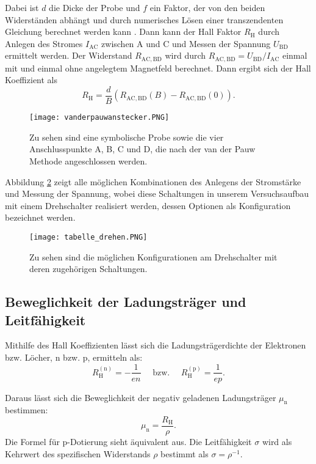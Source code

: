Dabei ist $d$ die Dicke der Probe und $f$ ein Faktor, der  von den beiden Widerständen abhängt und durch numerisches Lösen einer transzendenten Gleichung berechnet werden kann \autocite{hall}.
\newline Dann kann der Hall Faktor $R_\mathrm{H}$ durch Anlegen des Stromes $I_\mathrm{AC}$ zwischen A und C und Messen der Spannung $U_{\mathrm{BD}}$ ermittelt werden. Der Widerstand $R_{\mathrm{AC,BD}}$ wird durch $R_{\mathrm{AC,BD}}=U_{\mathrm{BD}}/I_\mathrm{AC}$ einmal mit und einmal ohne angelegtem Magnetfeld berechnet. Dann ergibt sich der Hall Koeffizient als
\begin{equation}\label{eq:RH}
    R_\mathrm{H}=\frac{d}{B}(R_{\mathrm{AC,BD}}(B)-R_{\mathrm{AC,BD}}(0)).
\end{equation}

 \begin{figure}[H]
    \centering
    \texttt{[image: vanderpauwanstecker.PNG]}
    \caption{Zu sehen sind eine symbolische Probe sowie die vier Anschlusspunkte A, B, C und D, die nach der van der Pauw Methode angeschlossen werden.\cite{hall}}
   \label{schaltungen}
\end{figure}
Abbildung \ref{schaltungen_vdp} zeigt alle möglichen Kombinationen des Anlegens der Stromstärke und Messung der Spannung, wobei diese Schaltungen in unserem Versuchsaufbau mit einem Drehschalter realisiert werden, dessen Optionen als Konfiguration bezeichnet werden.
 \begin{figure}[H]
    \centering
    \texttt{[image: tabelle\_drehen.PNG]}
    \caption{Zu sehen sind die möglichen Konfigurationen am Drehschalter mit deren zugehörigen Schaltungen.\cite{hall} }
   \label{schaltungen_vdp}
\end{figure}
\subsection{Beweglichkeit der Ladungsträger und Leitfähigkeit}
Mithilfe des Hall Koeffizienten lässt sich die Ladungsträgerdichte der Elektronen bzw. Löcher, n bzw. p, ermitteln als:
\begin{equation}\label{eq:RHn}
    R_{\mathrm{H}}^{(\mathrm{n})}=-\frac{1}{e n} \quad\text{ bzw. }\quad R_{\mathrm{H}}^{(\mathrm{p})}=\frac{1}{e p}.
\end{equation}

Daraus lässt sich die Beweglichkeit  der negativ geladenen Ladungsträger $\mu_{\mathrm{n}}$ bestimmen:
\begin{equation}\label{eq:mu}
    \mu_{\mathrm{n}}=\frac{R_{\mathrm{H}}}{\rho}.
\end{equation}
Die Formel für p-Dotierung sieht äquivalent aus.
Die Leitfähigkeit $\sigma$ wird als Kehrwert des spezifischen Widerstands $\rho$ bestimmt als $\sigma=\rho^{-1}$.


